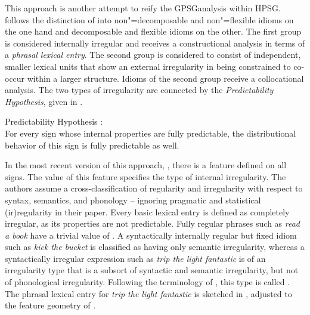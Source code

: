 \documentclass[output=paper,biblatex,babelshorthands,newtxmath,draftmode,colorlinks,citecolor=brown]{langscibook}
\begin{document}
This approach is another attempt to reify the GPSG\indexgpsg analysis
within HPSG.  \citet{Sailer2000a} follows the distinction of \citet{NSW94a} into non"=decomposable
and non"=flexible idioms on the one hand and decomposable and flexible idioms on the other. The
first group is considered internally irregular and receives a constructional analysis in terms of a
\emph{phrasal lexical entry}. The second group is considered to consist of
independent, smaller lexical units that show an external irregularity in being constrained to
co-occur within a larger structure.  Idioms of the second group receive a collocational
analysis. The two types of irregularity are connected by the \emph{Predictability Hypothesis}, given
in .

\vbox{
\eanoraggedright 
\label{PredHypo}
Predictability Hypothesis \citep[]{Sailer2000a}:\\
For every sign whose internal properties are fully predictable, the distributional
behavior of this sign is fully predictable as well.
\z 
}

\noindent
In the most recent version of this approach, \citet{Richter:Sailer:09,Richter:Sailer:14}, there is a
feature  defined on all signs. The value of this feature specifies the type of internal
irregularity.  The authors assume a cross-classification of regularity and irregularity with respect
to syntax, semantics, and phonology -- ignoring pragmatic and statistical (ir)regularity in their
paper.  Every basic lexical entry is defined as completely irregular, as its properties are not
predictable.  Fully regular phrases such as \emph{read a book} have a trivial value of .
A syntactically internally regular but fixed idiom such as \emph{kick the bucket} is classified as
having only semantic irregularity, whereas a syntactically irregular expression such as \emph{trip
  the light fantastic} is of an irregularity type that is a subsort of syntactic and semantic
irregularity, but not of phonological irregularity.  Following the terminology of \citet{FKoC88a},
this type is called .
%
The phrasal lexical entry for \emph{trip the light fantastic} is sketched in ,
adjusted to the feature geometry of \citet{Sag97a}.
\end{document}
